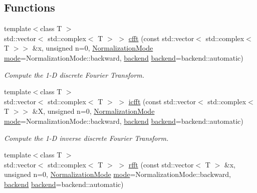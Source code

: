 \subsection*{Functions}
\begin{DoxyCompactItemize}
\item 
{\footnotesize template$<$class T $>$ }\\std\+::vector$<$ std\+::complex$<$ T $>$ $>$ \mbox{\hyperlink{namespacedsp_1_1fft_ae1e8b2af8a1d75b65f349492f865631d}{cfft}} (const std\+::vector$<$ std\+::complex$<$ T $>$$>$ \&x, unsigned n=0, \mbox{\hyperlink{namespacedsp_1_1fft_aadeffdb34ec53320437b1c6dd1354915}{Normalization\+Mode}} \mbox{\hyperlink{namespacedsp_a1d4932cf0fd90a0ecde3b2deffeb740c}{mode}}=Normalization\+Mode\+::backward, \mbox{\hyperlink{namespacedsp_1_1fft_a4fef2564f82f5eb8ea2d5c9909fb2ba4}{backend}} \mbox{\hyperlink{namespacedsp_1_1fft_a4fef2564f82f5eb8ea2d5c9909fb2ba4}{backend}}=backend\+::automatic)
\begin{DoxyCompactList}\small\item\em Compute the 1-\/D discrete Fourier Transform. \end{DoxyCompactList}\item 
{\footnotesize template$<$class T $>$ }\\std\+::vector$<$ std\+::complex$<$ T $>$ $>$ \mbox{\hyperlink{namespacedsp_1_1fft_ab08ff97f7230431add10365d4c8ee820}{icfft}} (const std\+::vector$<$ std\+::complex$<$ T $>$$>$ \&X, unsigned n=0, \mbox{\hyperlink{namespacedsp_1_1fft_aadeffdb34ec53320437b1c6dd1354915}{Normalization\+Mode}} \mbox{\hyperlink{namespacedsp_a1d4932cf0fd90a0ecde3b2deffeb740c}{mode}}=Normalization\+Mode\+::backward, \mbox{\hyperlink{namespacedsp_1_1fft_a4fef2564f82f5eb8ea2d5c9909fb2ba4}{backend}} \mbox{\hyperlink{namespacedsp_1_1fft_a4fef2564f82f5eb8ea2d5c9909fb2ba4}{backend}}=backend\+::automatic)
\begin{DoxyCompactList}\small\item\em Compute the 1-\/D inverse discrete Fourier Transform. \end{DoxyCompactList}\item 
{\footnotesize template$<$class T $>$ }\\std\+::vector$<$ std\+::complex$<$ T $>$ $>$ \mbox{\hyperlink{namespacedsp_1_1fft_a7fd22f50ee56c93d30935f0077361450}{rfft}} (const std\+::vector$<$ T $>$ \&x, unsigned n=0, \mbox{\hyperlink{namespacedsp_1_1fft_aadeffdb34ec53320437b1c6dd1354915}{Normalization\+Mode}} \mbox{\hyperlink{namespacedsp_a1d4932cf0fd90a0ecde3b2deffeb740c}{mode}}=Normalization\+Mode\+::backward, \mbox{\hyperlink{namespacedsp_1_1fft_a4fef2564f82f5eb8ea2d5c9909fb2ba4}{backend}} \mbox{\hyperlink{namespacedsp_1_1fft_a4fef2564f82f5eb8ea2d5c9909fb2ba4}{backend}}=backend\+::automatic)

\end{DoxyCompactItemize}
